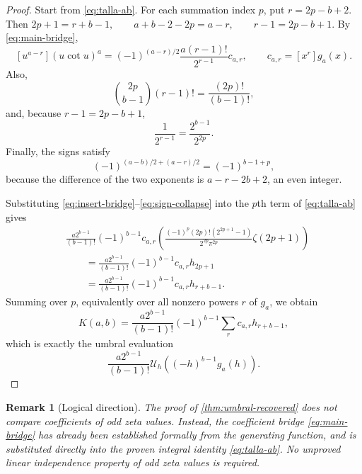 \documentclass[11pt,twoside]{article}
\newtheorem{remark}[theorem]{Remark}
\numberwithin{equation}{section}
\begin{document}
\begin{proof}
Start from \eqref{eq:talla-ab}.  For each summation index $p$, put
\(r=2p-b+2\).
Then
\(2p+1=r+b-1, \qquad a+b-2-2p=a-r, \qquad r-1=2p-b+1\).
By \eqref{eq:main-bridge},
\begin{equation}
\label{eq:insert-bridge}
[u^{a-r}](u\cot u)^a
=(-1)^{(a-r)/2}
\frac{a(r-1)!}{2^{r-1}}c_{a,r},
\qquad
c_{a,r}=[x^r]g_a(x).
\end{equation}
Also,
\begin{equation}
\label{eq:binomial-collapse}
\binom{2p}{b-1}(r-1)!
=\frac{(2p)!}{(b-1)!},
\end{equation}
and, because $r-1=2p-b+1$,
\begin{equation}
\label{eq:power-collapse}
\frac1{2^{r-1}}=\frac{2^{b-1}}{2^{2p}}.
\end{equation}
Finally, the signs satisfy
\begin{equation}
\label{eq:sign-collapse}
(-1)^{(a-b)/2+(a-r)/2}
=(-1)^{b-1+p},
\end{equation}
because the difference of the two exponents is
$a-r-2b+2$, an even integer.

Substituting \eqref{eq:insert-bridge}--\eqref{eq:sign-collapse} into the
$p$th term of \eqref{eq:talla-ab} gives
\begin{align*}
&\frac{a2^{b-1}}{(b-1)!}
(-1)^{b-1}c_{a,r}
\left(
\frac{(-1)^p(2p)!(2^{2p+1}-1)}{2^{2p}\pi^{2p}}
\zeta(2p+1)
\right)\\
&\qquad
=\frac{a2^{b-1}}{(b-1)!}
(-1)^{b-1}c_{a,r}h_{2p+1}\\
&\qquad
=\frac{a2^{b-1}}{(b-1)!}
(-1)^{b-1}c_{a,r}h_{r+b-1}.
\end{align*}
Summing over $p$, equivalently over all nonzero powers $r$ of $g_a$,
we obtain
\[
K(a,b)
=\frac{a2^{b-1}}{(b-1)!}(-1)^{b-1}
\sum_r c_{a,r}h_{r+b-1},
\]
which is exactly the umbral evaluation
\[
\frac{a2^{b-1}}{(b-1)!}
\mathcal U_h\!\left((-h)^{b-1}g_a(h)\right).
\]
\end{proof}

\begin{remark}[Logical direction]
The proof of \cref{thm:umbral-recovered} does not compare coefficients of
odd zeta values.  Instead, the coefficient bridge
\eqref{eq:main-bridge} has already been established formally from the
generating function, and is substituted directly into the proven
integral identity \eqref{eq:talla-ab}.  No unproved linear independence
property of odd zeta values is required.
\end{remark}
\end{document}
